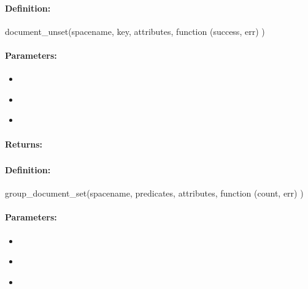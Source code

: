 \paragraph{Definition:}
\begin{javascriptcode}
document_unset(spacename, key, attributes, function (success, err) {})
\end{javascriptcode}
\paragraph{Parameters:}
\begin{itemize}[noitemsep]
\item {}\\

\item {}\\

\item {}\\

\end{itemize}

\paragraph{Returns:}


\pagebreak
\subsubsection{}
\label{api:nodejs:group_document_set}


\paragraph{Definition:}
\begin{javascriptcode}
group_document_set(spacename, predicates, attributes, function (count, err) {})
\end{javascriptcode}
\paragraph{Parameters:}
\begin{itemize}[noitemsep]
\item {}\\

\item {}\\

\item {}\\

\end{itemize}

